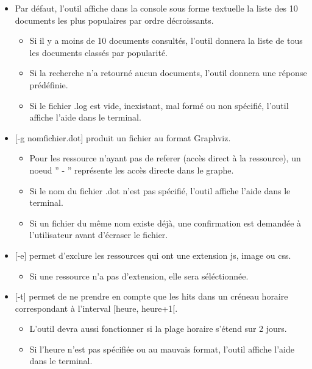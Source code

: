 \documentclass[a4paper]{article}
\begin{document}
	\begin{itemize}
		\item Par défaut, l'outil affiche dans la console sous forme textuelle la liste des 10 documents les plus populaires par ordre décroissants.
					\begin{itemize}
							\item Si il y a moins de 10 documents consultés, l'outil donnera la liste de tous les documents classés par popularité.
							\item Si la recherche n'a retourné aucun documents, l'outil donnera une réponse prédéfinie.
							\item Si le fichier .log est vide, inexistant, mal formé ou non spécifié, l'outil affiche l'aide dans le terminal.
					\end{itemize}
		\item{} [-g nomfichier.dot] produit un fichier au format Graphviz. 
					\begin{itemize}
							\item Pour les ressource n'ayant pas de referer (accès direct à la ressource), un noeud '' - '' représente les accès directe dans le graphe.
							\item Si le nom du fichier .dot n'est pas spécifié, l'outil affiche l'aide dans le terminal.
							\item Si un fichier du même nom existe déjà, une confirmation est demandée à l'utilisateur avant d'écraser le fichier.
					\end{itemize}
		\item{} [-e] permet d'exclure les ressources qui ont une extension js, image ou css.
					\begin{itemize}
							\item Si une ressource n'a pas d'extension, elle sera séléctionnée.
					\end{itemize}
		\item{} [-t] permet de ne prendre en compte que les hits dans un créneau horaire correspondant à l'interval [heure, heure+1[.
					\begin{itemize}
							\item L'outil devra aussi fonctionner si la plage horaire s'étend sur 2 jours.
							\item Si l'heure n'est pas spécifiée ou au mauvais format, l'outil affiche l'aide dans le terminal.
					\end{itemize}
	\end{itemize}
							
\newpage
\end{document}
